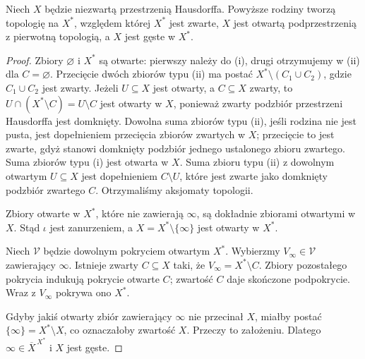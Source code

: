 \begin{lemat}
\label{lem:topog-uzwarcenia-aleksandrow-topologia}
Niech $X$ będzie niezwartą przestrzenią
Hausdorffa. Powyższe rodziny tworzą
topologię na $X^\ast$,
względem której $X^\ast$ jest zwarte,
$X$ jest otwartą podprzestrzenią
z pierwotną topologią, a $X$ jest
gęste w $X^\ast$.
\end{lemat}
\begin{proof}
Zbiory $\varnothing$ i $X^\ast$ są otwarte:
pierwszy należy do (i), drugi otrzymujemy
w (ii) dla $C=\varnothing$.
Przecięcie dwóch zbiorów typu (ii)
ma postać $X^\ast\setminus(C_1\cup C_2)$,
gdzie $C_1\cup C_2$ jest zwarty.
Jeżeli $U\subseteq X$ jest otwarty,
a $C\subseteq X$ zwarty, to
$U\cap(X^\ast\setminus C)=U\setminus C$
jest otwarty w $X$, ponieważ zwarty
podzbiór przestrzeni Hausdorffa
jest domknięty.
Dowolna suma zbiorów typu (ii),
jeśli rodzina nie jest pusta,
jest dopełnieniem przecięcia
zbiorów zwartych w $X$;
przecięcie to jest zwarte,
gdyż stanowi domknięty podzbiór
jednego ustalonego zbioru zwartego.
Suma zbiorów typu (i) jest otwarta w $X$.
Suma zbioru typu (ii) z dowolnym otwartym
$U\subseteq X$ jest dopełnieniem
$C\setminus U$, które jest zwarte jako
domknięty podzbiór zwartego $C$.
Otrzymaliśmy aksjomaty topologii.

Zbiory otwarte w $X^\ast$, które
nie zawierają $\infty$, są dokładnie
zbiorami otwartymi w $X$.
Stąd $\iota$ jest zanurzeniem,
a $X=X^\ast\setminus\{\infty\}$
jest otwarty w $X^\ast$.

Niech $\mathcal V$ będzie dowolnym
pokryciem otwartym $X^\ast$.
Wybierzmy $V_\infty\in\mathcal V$
zawierający $\infty$.
Istnieje zwarty $C\subseteq X$ taki, że
$V_\infty=X^\ast\setminus C$.
Zbiory pozostałego pokrycia
indukują pokrycie otwarte $C$;
zwartość $C$ daje skończone
podpokrycie. Wraz z $V_\infty$
pokrywa ono $X^\ast$.

Gdyby jakiś otwarty zbiór
zawierający $\infty$ nie przecinał $X$,
miałby postać $\{\infty\}=X^\ast\setminus X$,
co oznaczałoby zwartość $X$.
Przeczy to założeniu. Dlatego
$\infty\in\overline X^{\,X^\ast}$
i $X$ jest gęste.
\end{proof}


